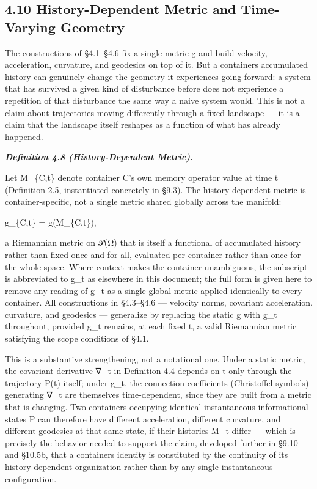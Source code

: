 \documentclass[
]{article}
\begin{document}
\hypertarget{history-dependent-metric-and-time-varying-geometry}{%
\subsection{4.10 History-Dependent Metric and Time-Varying
Geometry}\label{history-dependent-metric-and-time-varying-geometry}}

The constructions of §4.1--§4.6 fix a single metric g and build
velocity, acceleration, curvature, and geodesics on top of it. But a
containers accumulated history can genuinely change the geometry it
experiences going forward: a system that has survived a given kind of
disturbance before does not experience a repetition of that disturbance
the same way a naive system would. This is not a claim about
trajectories moving differently through a fixed landscape --- it is a
claim that the landscape itself reshapes as a function of what has
already happened.

\emph{\textbf{Definition 4.8 (History-Dependent Metric).}}

Let M\_\{C,t\} denote container C's own memory operator value at time t
(Definition 2.5, instantiated concretely in §9.3). The history-dependent
metric is container-specific, not a single metric shared globally across
the manifold:

g\_\{C,t\} = g(M\_\{C,t\}),

a Riemannian metric on 𝒫(Ω) that is itself a functional of accumulated
history rather than fixed once and for all, evaluated per container
rather than once for the whole space. Where context makes the container
unambiguous, the subscript is abbreviated to g\_t as elsewhere in this
document; the full form is given here to remove any reading of g\_t as a
single global metric applied identically to every container. All
constructions in §4.3--§4.6 --- velocity norms, covariant acceleration,
curvature, and geodesics --- generalize by replacing the static g with
g\_t throughout, provided g\_t remains, at each fixed t, a valid
Riemannian metric satisfying the scope conditions of §4.1.

This is a substantive strengthening, not a notational one. Under a
static metric, the covariant derivative ∇\_t in Definition 4.4 depends
on t only through the trajectory P(t) itself; under g\_t, the connection
coefficients (Christoffel symbols) generating ∇\_t are themselves
time-dependent, since they are built from a metric that is changing. Two
containers occupying identical instantaneous informational states P can
therefore have different acceleration, different curvature, and
different geodesics at that same state, if their histories M\_t differ
--- which is precisely the behavior needed to support the claim,
developed further in §9.10 and §10.5b, that a containers identity is
constituted by the continuity of its history-dependent organization
rather than by any single instantaneous configuration.
\end{document}
